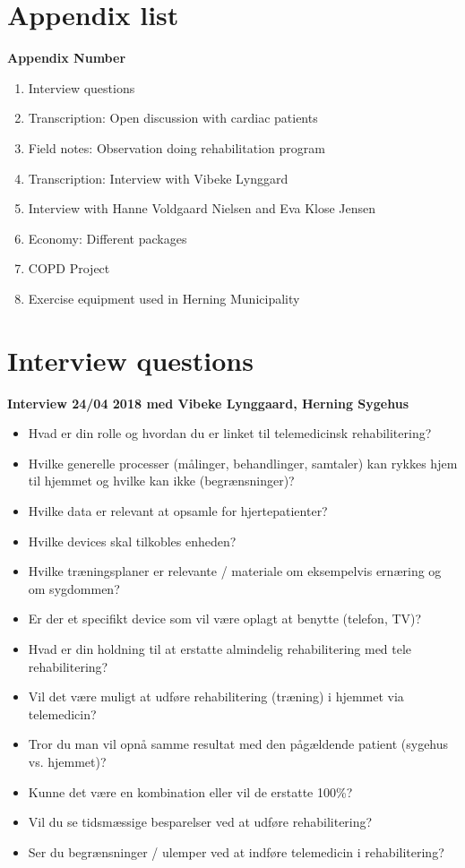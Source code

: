 \chapter{Appendix list}

\textbf{Appendix Number}
\begin{enumerate}
	\item Interview questions
	\item Transcription: Open discussion with cardiac patients
	\item Field notes: Observation doing rehabilitation program
	\item Transcription: Interview with Vibeke Lynggard
	\item Interview with Hanne Voldgaard Nielsen and Eva Klose Jensen
	\item Economy: Different packages
	\item COPD Project
	\item Exercise equipment used in Herning Municipality
\end{enumerate}



\chapter{Interview questions} \label{interviewquestion}

\textbf{Interview 24/04 2018 med Vibeke Lynggaard, Herning Sygehus} 
\begin{itemize}
	\item Hvad er din rolle og hvordan du er linket til telemedicinsk rehabilitering?
	\item Hvilke generelle processer (målinger, behandlinger, samtaler) kan rykkes hjem til hjemmet og hvilke kan ikke (begrænsninger)?
	\item Hvilke data er relevant at opsamle for hjertepatienter?
	\item Hvilke devices skal tilkobles enheden?
	\item Hvilke træningsplaner er relevante / materiale om eksempelvis ernæring og om sygdommen? 
	\item Er der et specifikt device som vil være oplagt at benytte (telefon, TV)? 
	\item Hvad er din holdning til at erstatte almindelig rehabilitering med tele rehabilitering? 
	\item Vil det være muligt at udføre rehabilitering (træning) i hjemmet via telemedicin?
	\item Tror du man vil opnå samme resultat med den pågældende patient (sygehus vs. hjemmet)?
	\item Kunne det være en kombination eller vil de erstatte 100\%? 
	\item Vil du se tidsmæssige besparelser ved at udføre rehabilitering?
	\item Ser du begrænsninger / ulemper ved at indføre telemedicin i rehabilitering? 
\end{itemize}

